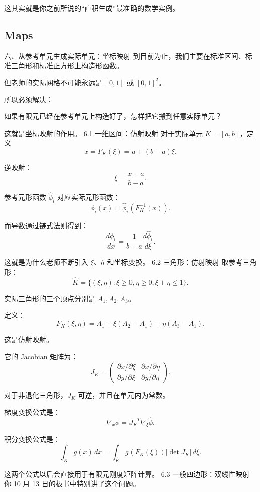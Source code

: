 这其实就是你之前所说的“直积生成”最准确的数学实例。


\subsection{Maps}
六、从参考单元生成实际单元：坐标映射
到目前为止，我们主要在标准区间、标准三角形和标准正方形上构造形函数。

但老师的实际网格不可能永远是 \([0,1]\) 或 \([0,1]^2\)。

所以必须解决：

如果有限元已经在参考单元上构造好了，怎样把它搬到任意实际单元？

这就是坐标映射的作用。
6.1 一维区间：仿射映射
对于实际单元 \(K=[a,b]\)，定义
\[
    x=F_K(\xi)=a+(b-a)\xi.
\]

逆映射：
\[
    \xi=\frac{x-a}{b-a}.
\]

参考元形函数 \(\widehat\phi_i\) 对应实际元形函数：
\[
    \boxed{
        \phi_i(x)=\widehat\phi_i(F_K^{-1}(x)).
    }
\]

而导数通过链式法则得到：
\[
    \boxed{
        \frac{d\phi_i}{dx}
        =\frac1{b-a}\frac{d\widehat\phi_i}{d\xi}.
    }
\]

这就是为什么老师不断引入 \(\xi\)、\(h\) 和坐标变换。
6.2 三角形：仿射映射
取参考三角形：
\[
    \widehat K
    =\{(\xi,\eta):\xi\ge0,\eta\ge0,\xi+\eta\le1\}.
\]

实际三角形的三个顶点分别是 \(A_1,A_2,A_3\)。

定义：
\[
    \boxed{
        F_K(\xi,\eta)
        =A_1+\xi(A_2-A_1)+\eta(A_3-A_1).
    }
\]

这是仿射映射。

它的 Jacobian 矩阵为：
\[
    J_K=
    \begin{pmatrix}
        \partial x/\partial\xi & \partial x/\partial\eta \\
        \partial y/\partial\xi & \partial y/\partial\eta
    \end{pmatrix}.
\]

对于非退化三角形，\(J_K\) 可逆，并且在单元内为常数。

梯度变换公式是：
\[
    \boxed{
        \nabla_x\phi
        =J_K^{-T}\nabla_{\xi}\widehat\phi.
    }
\]

积分变换公式是：
\[
    \boxed{
        \int_Kg(x)\,dx
        =
        \int_{\widehat K}
        g(F_K(\xi))|\det J_K|\,d\xi.
    }
\]

这两个公式以后会直接用于有限元刚度矩阵计算。
6.3 一般四边形：双线性映射
你 10 月 13 日的板书中特别讲了这个问题。

